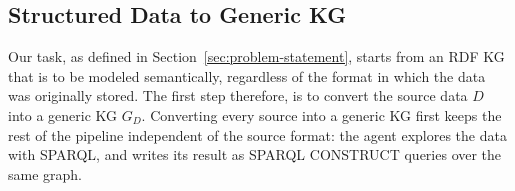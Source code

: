 \subsection{Structured Data to Generic KG}\label{sec:approach-generic}
Our task, as defined in Section~\ref{sec:problem-statement}, starts from an RDF KG that is to be modeled semantically, regardless of the format in which the data was originally stored. The first step therefore, is to convert the source data \(D\) into a generic KG \(G_D\).  Converting every source into a generic KG first keeps the rest of the pipeline independent of the source format: the agent explores the data with SPARQL, and writes its result as SPARQL CONSTRUCT queries over the same graph. 



